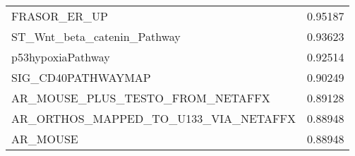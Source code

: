\documentclass{scrartcl}
\numberwithin{figure}{section}
\numberwithin{table}{section}
\begin{document}
\begin{table}[h!]
\begin{tabular}{ll}
  FRASOR\_ER\_UP                                            & 0.95187 \\
  ST\_Wnt\_beta\_catenin\_Pathway                           & 0.93623 \\
  p53hypoxiaPathway                                         & 0.92514 \\
  SIG\_CD40PATHWAYMAP                                       & 0.90249 \\
  AR\_MOUSE\_PLUS\_TESTO\_FROM\_NETAFFX                     & 0.89128 \\
  AR\_ORTHOS\_MAPPED\_TO\_U133\_VIA\_NETAFFX                & 0.88948 \\
  AR\_MOUSE                                                 & 0.88948 \\
\bottomrule
\end{tabular}
\end{table}
\end{document}
